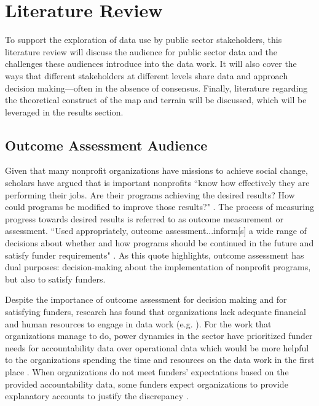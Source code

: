 \section{Literature Review}

To support the exploration of data use by public sector stakeholders, this literature review will discuss the audience for public sector data and the challenges these audiences introduce into the data work. It will also cover the ways that different stakeholders at different levels share data and approach decision making---often in the absence of consensus. Finally, literature regarding the theoretical construct of the map and terrain will be discussed, which will be leveraged in the results section.

\subsection{Outcome Assessment Audience}
Given that many nonprofit organizations have missions to achieve social change, scholars have argued that is important nonprofits ``know how effectively they are performing their jobs. Are their programs achieving the desired results? How could programs be modified to improve those results?" \citep{Thomas2016Outcome}. The process of measuring progress towards desired results is referred to as outcome measurement or assessment. ``Used appropriately, outcome assessment...inform[s] a wide range of decisions about whether and how programs should be continued in the future and satisfy funder requirements" \citep{Thomas2016Outcome}. As this quote highlights, outcome assessment has dual purposes: decision-making about the implementation of nonprofit programs, but also to satisfy funders.

Despite the importance of outcome assessment for decision making and for satisfying funders, research has found that organizations lack adequate financial and human resources to engage in data work (e.g. \citet{Bopp2017DbD,Erete2016Storytelling}). For the work that organizations manage to do, power dynamics in the sector have prioritized funder needs for accountability data over operational data which would be more helpful to the organizations spending the time and resources on the data work in the first place \citep{Bopp2017DbD,LeDantec2008Trenches,LeDantec2010Boundaries,Benjamin2008Account,Voida2017Currencies,Stoll2010Interorg}. When organizations do not meet funders' expectations based on the provided accountability data, some funders expect organizations to provide explanatory accounts to justify the discrepancy \citep{Benjamin2008Account}.

